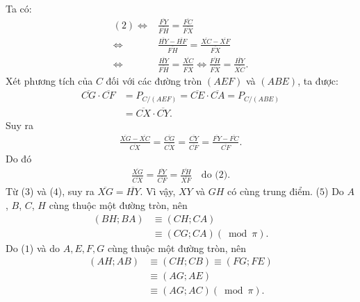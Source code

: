 \begin{multicols}{2}
	\vskip 0.05cm
	Ta có:
	\begin{align*}
		\left( 2 \right) \Leftrightarrow& \frac{{\overline {FY} }}{{\overline {FH} }} = \frac{{\overline {FC} }}{{\overline {FX} }} \\
		\Leftrightarrow &\frac{{\overline {HY}  - \overline {HF} }}{{\overline {FH} }} = \frac{{\overline {XC}  - \overline {XF} }}{{\overline {FX} }}\\ \Leftrightarrow &\frac{{\overline {HY} }}{{\overline {FH} }} = \frac{{\overline {XC} }}{{\overline {FX} }} \Leftrightarrow \frac{{\overline {FH} }}{{\overline {FX} }} = \frac{{\overline {HY} }}{{\overline {XC} }}. \tag{$3$}
	\end{align*}
	Xét phương tích của $C$ đối với các đường tròn $(AEF)$ và $(ABE)$, ta được:
	\begin{align*}
		\overline {CG}  \cdot \overline {CF}  &= {P_{C/\left( {AEF} \right)}} = \overline {CE}  \cdot \overline {CA}  = {P_{C/\left( {ABE} \right)}}\\
		& = \overline {CX}  \cdot \overline {CY} .
	\end{align*}
	Suy ra
	\begin{align*}
		\frac{{\overline {XG}  - \overline {XC} }}{{\overline {CX} }} = \frac{{\overline {CG} }}{{\overline {CX} }} = \frac{{\overline {CY} }}{{\overline {CF} }} = \frac{{\overline {FY}  - \overline {FC} }}{{\overline {CF} }}.
	\end{align*}
	Do đó
	\begin{align*}
		\frac{{\overline {XG} }}{{\overline {CX} }} = \frac{{\overline {FY} }}{{\overline {CF} }} = \frac{{\overline {FH} }}{{\overline {XF} }} \quad \text{do ($2$).} \tag{$4$}
	\end{align*}
	Từ ($3$) và ($4$), suy ra $\overline {XG}  = \overline {HY} .$
	\vskip 0.05cm 
	Vì vậy, $XY$ và $GH$ có cùng trung điểm.                 \hfill ($5$)
	\vskip 0.05cm
	Do $A$, $B$, $C$, $H$ cùng thuộc một đường tròn, nên
	\begin{align*}
		\left( {BH;BA} \right) &\equiv \left( {CH;CA} \right) \\
		&\equiv \left( {CG;CA} \right)\left( {\bmod \pi } \right). \tag{$6$}
	\end{align*}
	Do ($1$) và do $A, E, F, G$ cùng thuộc một đường tròn, nên
	\begin{align*}
		\left( {AH;AB} \right) &\equiv \left( {CH;CB} \right) \equiv \left( {FG;FE} \right) \\
		&\equiv \left( {AG;AE} \right) \\
		&\equiv \left( {AG;AC} \right)\left( {\bmod \pi } \right). \tag{$7$}

\end{align*}
\end{multicols}
